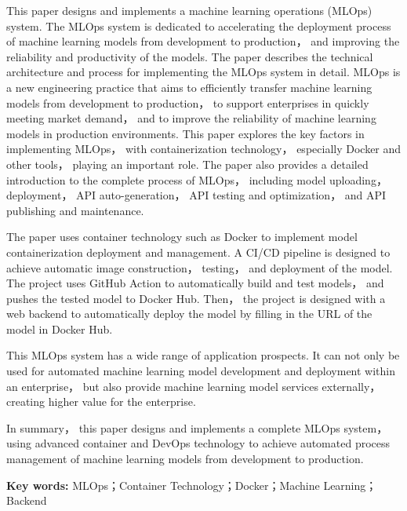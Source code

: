\documentclass{HDU-Bachelor-Thesis}
\begin{document}
This paper designs and implements a machine learning operations (MLOps) system. The MLOps system is dedicated to accelerating the deployment process of machine learning models from development to production， and improving the reliability and productivity of the models. The paper describes the technical architecture and process for implementing the MLOps system in detail. MLOps is a new engineering practice that aims to efficiently transfer machine learning models from development to production， to support enterprises in quickly meeting market demand， and to improve the reliability of machine learning models in production environments. This paper explores the key factors in implementing MLOps， with containerization technology， especially Docker and other tools， playing an important role. The paper also provides a detailed introduction to the complete process of MLOps， including model uploading， deployment， API auto-generation， API testing and optimization， and API publishing and maintenance.

The paper uses container technology such as Docker to implement model containerization deployment and management. A CI/CD pipeline is designed to achieve automatic image construction， testing， and deployment of the model. The project uses GitHub Action to automatically build and test models， and pushes the tested model to Docker Hub. Then， the project is designed with a web backend to automatically deploy the model by filling in the URL of the model in Docker Hub.

This MLOps system has a wide range of application prospects. It can not only be used for automated machine learning model development and deployment within an enterprise， but also provide machine learning model services externally， creating higher value for the enterprise.

In summary， this paper designs and implements a complete MLOps system， using advanced container and DevOps technology to achieve automated process management of machine learning models from development to production.

\vspace{\baselineskip}\noindent
\textbf{Key words:} MLOps；Container Technology；Docker；Machine Learning；Backend

\clearpage
\tableofcontents
\clearpage

\listoffigures
\listoftables

\clearpage
\end{document}
